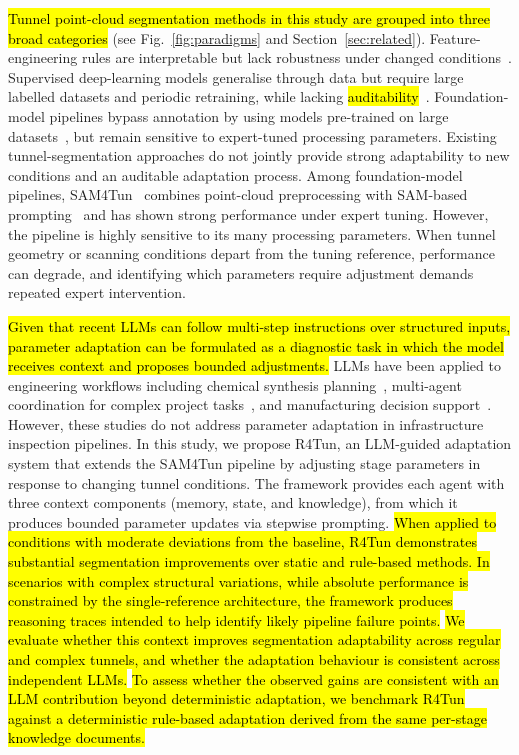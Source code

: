 \documentclass[a4paper,fleqn]{cas-dc}
\begin{document}
{\hl{Tunnel point-cloud segmentation methods in this study are grouped into three broad categories} (see Fig.~\ref{fig:paradigms} and Section~\ref{sec:related}). Feature-engineering rules are interpretable but lack robustness under changed conditions~\citep{weidner2024generalized}. Supervised deep-learning models generalise through data but require large labelled datasets and periodic retraining, while lacking \hl{auditability}~\citep{duan2023high, cha2024deep, su2024review}. Foundation-model pipelines bypass annotation by using models pre-trained on large datasets~\citep{bommasani2021foundation, kirillov2023sam}, but remain sensitive to expert-tuned processing parameters. Existing tunnel-segmentation approaches do not jointly provide strong adaptability to new conditions and an auditable adaptation process. Among foundation-model pipelines, SAM4Tun~\citep{ye2025sam4tun} combines point-cloud preprocessing with SAM-based prompting~\citep{kirillov2023sam} and has shown strong performance under expert tuning. However, the pipeline is highly sensitive to its many processing parameters. When tunnel geometry or scanning conditions depart from the tuning reference, performance can degrade, and identifying which parameters require adjustment demands repeated expert intervention.

\hl{Given that recent LLMs can follow multi-step instructions over structured inputs, parameter adaptation can be formulated as a diagnostic task in which the model receives context and proposes bounded adjustments.} LLMs have been applied to engineering workflows including chemical synthesis planning~\citep{bradley2023chemcrow}, multi-agent coordination for complex project tasks~\citep{qian2024chatdev, hong2024metagpt, chen2024comm}, and manufacturing decision support~\citep{garcia2024manufacturing}. However, these studies do not address parameter adaptation in infrastructure inspection pipelines. In this study, we propose R4Tun, an LLM-guided adaptation system that extends the SAM4Tun pipeline by adjusting stage parameters in response to changing tunnel conditions. The framework provides each agent with three context components (memory, state, and knowledge), from which it produces bounded parameter updates via stepwise prompting. \hl{When applied to conditions with moderate deviations from the baseline, R4Tun demonstrates substantial segmentation improvements over static and rule-based methods. In scenarios with complex structural variations, while absolute performance is constrained by the single-reference architecture, the framework produces reasoning traces intended to help identify likely pipeline failure points.} \hl{We evaluate whether this context improves segmentation adaptability across regular and complex tunnels, and whether the adaptation behaviour is consistent across independent LLMs.} \hl{To assess whether the observed gains are consistent with an LLM contribution beyond deterministic adaptation, we benchmark R4Tun against a deterministic rule-based adaptation derived from the same per-stage knowledge documents.}

}
\end{document}
